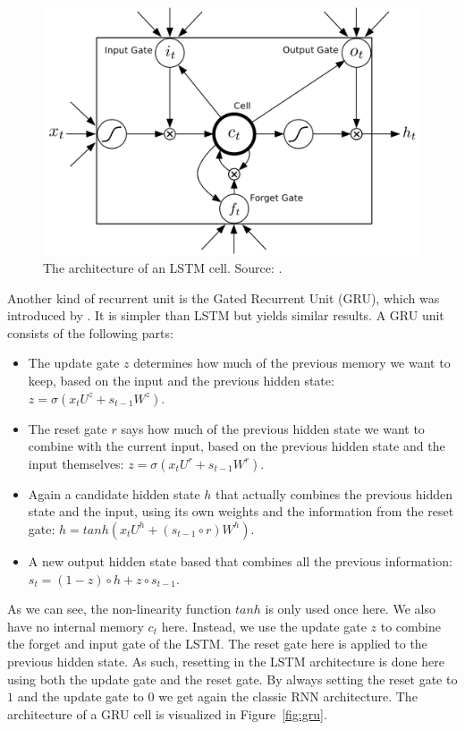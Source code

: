 \documentclass[a4paper, 11pt]{article}
\begin{document}
\begin{figure}[htb]
    \centering
    \includegraphics[width=\linewidth]{images/lstm.png}
    \caption[Long short-term memory cell]{The architecture of an LSTM cell. Source: \cite{journals/corr/Graves13}.}
    \label{fig:lstm}
\end{figure}
Another kind of recurrent unit is the Gated Recurrent Unit (GRU), which was introduced by \cite{Cho2014LearningTranslation}. It is simpler than LSTM but yields similar results. A GRU unit consists of the following parts:
\begin{itemize}
\item The update gate $z$ determines how much of the previous memory we want to keep, based on the input and the previous hidden state: $z = \sigma (x_tU^z + s_{t-1}W^z)$.
\item The reset gate $r$ says how much of the previous hidden state we want to combine with the current input, based on the previous hidden state and the input themselves: $z = \sigma (x_tU^r + s_{t-1}W^r)$.
\item Again a candidate hidden state $h$ that actually combines the previous hidden state and the input, using its own weights and the information from the reset gate: $h = tanh(x_tU^h + (s_{t-1} \circ r)W^h)$.
\item A new output hidden state based that combines all the previous information: $s_t = (1-z) \circ h + z \circ s_{t-1}$.
\end{itemize}
As we can see, the non-linearity function $tanh$ is only used once here. We also have no internal memory $c_t$ here. Instead, we use the update gate $z$ to combine the forget and input gate of the LSTM. The reset gate here is applied to the previous hidden state. As such, resetting in the LSTM architecture is done here using both the update gate and the reset gate. By always setting the reset gate to $1$ and the update gate to $0$ we get again the classic RNN architecture. The architecture of a GRU cell is visualized in Figure~\ref{fig:gru}.\\
\end{document}
